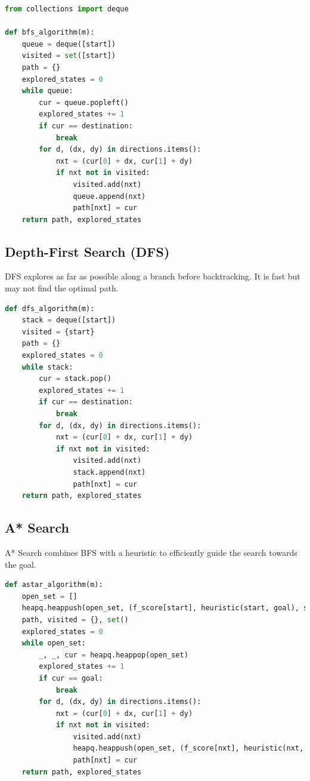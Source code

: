 \documentclass{article}
\begin{document}
\begin{lstlisting}[language=Python, caption=BFS Implementation]
from collections import deque

def bfs_algorithm(m):
    queue = deque([start])
    visited = set([start])
    path = {}
    explored_states = 0
    while queue:
        cur = queue.popleft()
        explored_states += 1
        if cur == destination:
            break
        for d, (dx, dy) in directions.items():
            nxt = (cur[0] + dx, cur[1] + dy)
            if nxt not in visited:
                visited.add(nxt)
                queue.append(nxt)
                path[nxt] = cur
    return path, explored_states
\end{lstlisting}

\subsection{Depth-First Search (DFS)}
DFS explores as far as possible along a branch before backtracking. It is fast but may not find the optimal path.

\begin{lstlisting}[language=Python, caption=DFS Implementation]
def dfs_algorithm(m):
    stack = deque([start])
    visited = {start}
    path = {}
    explored_states = 0
    while stack:
        cur = stack.pop()
        explored_states += 1
        if cur == destination:
            break
        for d, (dx, dy) in directions.items():
            nxt = (cur[0] + dx, cur[1] + dy)
            if nxt not in visited:
                visited.add(nxt)
                stack.append(nxt)
                path[nxt] = cur
    return path, explored_states
\end{lstlisting}

\subsection{A* Search}
A* Search combines BFS with a heuristic to efficiently guide the search towards the goal.

\begin{lstlisting}[language=Python, caption=A* Implementation]
def astar_algorithm(m):
    open_set = []
    heapq.heappush(open_set, (f_score[start], heuristic(start, goal), start))
    path, visited = {}, set()
    explored_states = 0
    while open_set:
        _, _, cur = heapq.heappop(open_set)
        explored_states += 1
        if cur == goal:
            break
        for d, (dx, dy) in directions.items():
            nxt = (cur[0] + dx, cur[1] + dy)
            if nxt not in visited:
                visited.add(nxt)
                heapq.heappush(open_set, (f_score[nxt], heuristic(nxt, goal), nxt))
                path[nxt] = cur
    return path, explored_states
\end{lstlisting}
\end{document}
